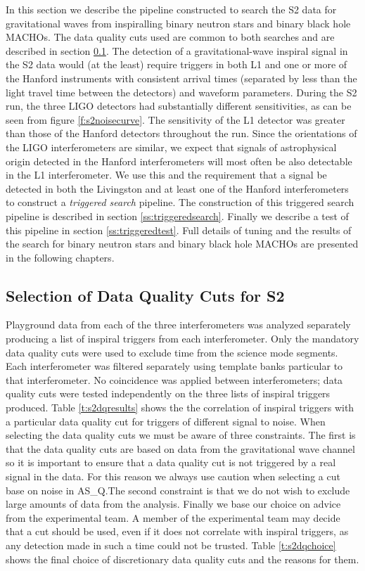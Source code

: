In this section we describe the pipeline constructed to search the S2 data for
gravitational waves from inspiralling binary neutron stars and binary black
hole MACHOs. The data quality cuts used are common to both searches and are
described in section \ref{ss:s2dqselection}. The detection of a
gravitational-wave inspiral signal in the S2 data would (at the least) require
triggers in both L1 and one or more of the Hanford instruments with consistent
arrival times (separated by less than the light travel time between the
detectors) and waveform parameters. During the S2 run, the three LIGO
detectors had substantially different sensitivities, as can be seen from
figure \ref{f:s2noisecurve}. The sensitivity of the L1 detector was greater
than those of the Hanford detectors throughout the run. Since the orientations
of the LIGO interferometers are similar, we expect that signals of
astrophysical origin detected in the Hanford interferometers will most often
be also detectable in the L1 interferometer.  We use this and the requirement
that a signal be detected in both the Livingston and at least one of the
Hanford interferometers to construct a {\em triggered search} pipeline. The
construction of this triggered search pipeline is described in section
\ref{ss:triggeredsearch}. Finally we describe a test of this pipeline in
section \ref{ss:triggeredtest}. Full details of tuning and the results of the
search for binary neutron stars and binary black hole MACHOs are presented in
the following chapters.

\subsection{Selection of Data Quality Cuts for S2}
\label{ss:s2dqselection}

Playground data from each of the three interferometers was analyzed separately
producing a list of inspiral triggers from each interferometer. Only the
mandatory data quality cuts were used to exclude time from the science mode
segments. Each interferometer was filtered separately using template banks
particular to that interferometer. No coincidence was applied between
interferometers; data quality cuts were tested independently on the three
lists of inspiral triggers produced. Table \ref{t:s2dqresults} shows the the
correlation of inspiral triggers with a particular data quality cut for
triggers of different signal to noise. When selecting the data quality cuts we
must be aware of three constraints. The first is that the data quality cuts
are based on data from the gravitational wave channel so it is important to
ensure that a data quality cut is not triggered by a real signal in the data.
For this reason we always use caution when selecting a cut base on noise in
AS\_Q.\@ The second constraint is that we do not wish to exclude large amounts
of data from the analysis.  Finally we base our choice on advice from the
experimental team. A member of the experimental team may decide that a
cut should be used, even if it does not correlate with inspiral triggers, as
any detection made in such a time could not be trusted. Table
\ref{t:s2dqchoice} shows the final choice of discretionary data quality cuts
and the reasons for them.


